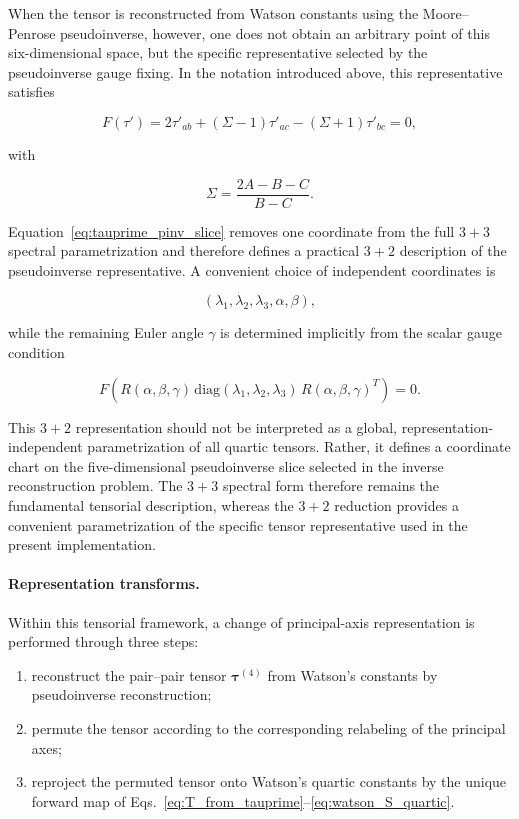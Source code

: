 When the tensor is reconstructed from Watson constants using the
Moore--Penrose pseudoinverse, however, one does not obtain an arbitrary
point of this six-dimensional space, but the specific representative
selected by the pseudoinverse gauge fixing. In the notation introduced
above, this representative satisfies

\begin{equation}
F(\tau')=
2\tau'_{ab}+(\Sigma-1)\tau'_{ac}-(\Sigma+1)\tau'_{bc}=0,
\label{eq:tauprime_pinv_slice}
\end{equation}

with

\begin{equation}
\Sigma=\frac{2A-B-C}{B-C}.
\end{equation}

Equation~\eqref{eq:tauprime_pinv_slice} removes one coordinate from the
full $3+3$ spectral parametrization and therefore defines a practical
$3+2$ description of the pseudoinverse representative.
A convenient choice of independent coordinates is

\[
(\lambda_1,\lambda_2,\lambda_3,\alpha,\beta),
\]

while the remaining Euler angle $\gamma$ is determined implicitly from
the scalar gauge condition

\begin{equation}
F\!\left(
R(\alpha,\beta,\gamma)\,
\mathrm{diag}(\lambda_1,\lambda_2,\lambda_3)\,
R(\alpha,\beta,\gamma)^T
\right)=0.
\label{eq:gamma_from_gauge}
\end{equation}

This $3+2$ representation should not be interpreted as a global,
representation-independent parametrization of all quartic tensors.
Rather, it defines a coordinate chart on the five-dimensional
pseudoinverse slice selected in the inverse reconstruction problem.
The $3+3$ spectral form therefore remains the fundamental tensorial
description, whereas the $3+2$ reduction provides a convenient
parametrization of the specific tensor representative used in the
present implementation.

\paragraph{Representation transforms.}

Within this tensorial framework, a change of principal-axis
representation is performed through three steps:

\begin{enumerate}
\item reconstruct the pair--pair tensor $\boldsymbol\tau^{(4)}$ from
Watson's constants by pseudoinverse reconstruction;

\item permute the tensor according to the corresponding relabeling of
the principal axes;

\item reproject the permuted tensor onto Watson's quartic constants by
the unique forward map of
Eqs.~\eqref{eq:T_from_tauprime}--\eqref{eq:watson_S_quartic}.
\end{enumerate}

